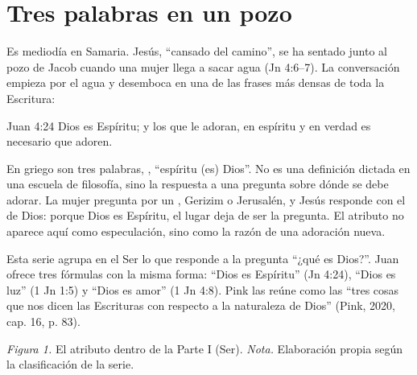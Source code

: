
\section{Tres palabras en un pozo}

Es mediodía en Samaria. Jesús, ``cansado del camino'', se ha sentado junto al pozo de Jacob cuando una mujer llega a sacar agua (Jn 4:6--7). La conversación empieza por el agua y desemboca en una de las frases más densas de toda la Escritura:

\begin{verso}{Juan 4:24}
Dios es Espíritu; y los que le adoran, en espíritu y en verdad es necesario que adoren.
\end{verso}

En griego son tres palabras, , ``espíritu (es) Dios''. No es una definición dictada en una escuela de filosofía, sino la respuesta a una pregunta sobre dónde se debe adorar. La mujer pregunta por un , Gerizim o Jerusalén, y Jesús responde con el  de Dios: porque Dios es Espíritu, el lugar deja de ser la pregunta. El atributo no aparece aquí como especulación, sino como la razón de una adoración nueva.

Esta serie agrupa en el Ser lo que responde a la pregunta ``¿qué es Dios?''. Juan ofrece tres fórmulas con la misma forma: ``Dios es Espíritu'' (Jn 4:24), ``Dios es luz'' (1 Jn 1:5) y ``Dios es amor'' (1 Jn 4:8). Pink las reúne como las ``tres cosas que nos dicen las Escrituras con respecto a la naturaleza de Dios'' (Pink, 2020, cap. 16, p. 83).

\begin{center}
\par
{\footnotesize\color{gris}\textit{Figura 1.} El atributo dentro de la Parte I (Ser). \textit{Nota.} Elaboración propia según la clasificación de la serie.}
\end{center}

